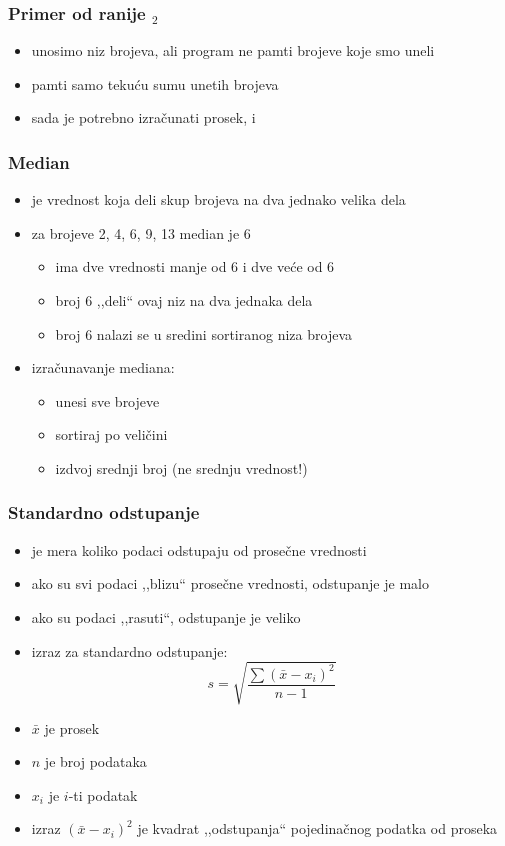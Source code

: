 \documentclass[utf8,compress]{beamer}
\begin{document}
\begin{frame}[fragile]
  \frametitle{Primer od ranije $_2$}
  \begin{itemize}
    \item unosimo niz brojeva, ali program ne pamti  brojeve koje smo uneli
    \item pamti samo tekuću sumu unetih brojeva
    \item sada je potrebno izračunati prosek,  i 
  \end{itemize}
\end{frame}

\begin{frame}[fragile]
  \frametitle{Median}
  \begin{itemize}
    \item {} je vrednost koja deli skup brojeva na dva jednako velika dela
    \item za brojeve 2, 4, 6, 9, 13 median je 6
    \begin{itemize}
      \item ima dve vrednosti manje od 6 i dve veće od 6
      \item broj 6 ,,deli`` ovaj niz na dva jednaka dela
      \item broj 6 nalazi se u sredini sortiranog niza brojeva
    \end{itemize}
    \item izračunavanje mediana:
    \begin{itemize}
      \item unesi sve brojeve
      \item sortiraj po veličini
      \item izdvoj srednji broj (ne srednju vrednost!)
    \end{itemize}
  \end{itemize}
\end{frame}

\begin{frame}[fragile]
  \frametitle{Standardno odstupanje}
  \begin{itemize}
    \item {} je mera koliko podaci odstupaju od prosečne vrednosti
    \item ako su svi podaci ,,blizu`` prosečne vrednosti, odstupanje je malo
    \item ako su podaci ,,rasuti``, odstupanje je veliko
    \item izraz za standardno odstupanje: \\
    $$ s = \sqrt{\frac{\sum{(\bar{x}-x_i)^2}}{n-1}} $$
    \item $\bar{x}$ je prosek
    \item $n$ je broj podataka
    \item $x_i$ je $i$-ti podatak
    \item izraz $(\bar{x} - x_i)^2$ je kvadrat ,,odstupanja`` pojedinačnog podatka od proseka
  \end{itemize}
\end{frame}
\end{document}
